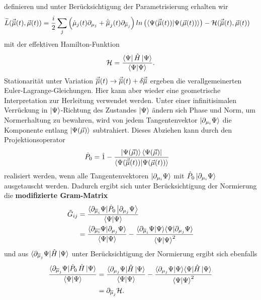 definieren und unter Berücksichtigung der Parametrisierung erhalten wir
\begin{align}
        \widetilde{L}(\vec{\overline{\mu}}(t),\vec{\mu}(t)) &= \frac{i}{2}\sum_j\left(\dot{\mu}_j(t)\partial_{\mu_j} + \dot{\overline{\mu}}_j(t)\partial_{\overline{\mu}_j}\right)
        ln\left(\langle\Psi(\vec{\overline{\mu}}(t))|\Psi(\vec{\mu}(t))\rangle\right) - \mathcal{H}(\vec{\overline{\mu}}(t),\vec{\mu}(t))
\end{align}
mit der effektiven Hamilton-Funktion
\begin{align}
    \mathcal{H} = \frac{\bra{\Psi}\hat{H}\ket{\Psi}}{\bra{\Psi}\ket{\Psi}}.
\end{align}
Stationarität unter Variation $\vec{\overline{\mu}}(t)\rightarrow \vec{\overline{\mu}}(t) + \delta\vec{\overline{\mu}}$ ergeben die 
verallgemeinerten Euler-Lagrange-Gleichungen. Hier kann aber wieder eine geometrische Interpretation zur Herleitung verwendet werden. Unter einer 
infinitisimalen Verrückung in $\ket{\Psi}$-Richtung des Zustandes $\ket{\Psi}$ ändern sich Phase und Norm, um Normerhaltung zu bewahren, wird von jedem 
Tangentenvektor $\ket{\partial_{\mu_i}\Psi}$ die Komponente entlang $\ket{\Psi(\vec{\mu})}$ subtrahiert. Dieses Abziehen kann durch den 
Projektionsoperator 
\begin{align}
    \hat{P}_0 &= \hat{1} - \frac{\ket{\Psi(\vec{\mu})}\bra{\Psi(\vec{\mu})}}{\langle\Psi(\vec{\overline{\mu}}(t))|\Psi(\vec{\mu}(t))\rangle}
\end{align}
realisiert werden, wenn alle Tangentenvektoren $\ket{\partial_{\mu_i}\Psi}$ mit $\hat{P}_0\ket{\partial_{\mu_i}\Psi}$ ausgetauscht werden.
Dadurch ergibt sich unter Berücksichtigung der Normierung die \textbf{modifizierte Gram-Matrix}
\begin{align}
    \tilde{G}_{ij} &= \frac{\langle\partial_{\overline{\mu}_i}\Psi|\hat{P}_0\ket{\partial_{\mu_j}\Psi}}{\bra{\Psi}\ket{\Psi}}  \nonumber \\
    &= \frac{\langle\partial_{\overline{\mu_i}}\Psi|\partial_{\mu_j}\Psi\rangle}{\bra{\Psi}\ket{\Psi}}
    - \frac{\langle\partial_{\overline{\mu}_i}\Psi|\Psi\rangle\langle\Psi|\partial_{\mu_j}\Psi\rangle}{\bra{\Psi}\ket{\Psi}^2}
\end{align}
und aus $ \langle\partial_{\overline{\mu}_j}\Psi|\hat{H}\ket{\Psi}$ unter Berücksichtigung der Normierung ergibt sich ebenfalls
\begin{align}
    \frac{\langle\partial_{\overline{\mu}_j}\Psi|\hat{P}_0\thinspace\hat{H}\ket{\Psi}}{\langle\Psi|\Psi\rangle}    
                &= \frac{\langle\partial_{\mu_j}\Psi|\hat{H}\ket{\Psi}}{\bra{\Psi}\ket{\Psi}} 
                - \frac{\langle\partial_{\mu_j}\Psi|\Psi\rangle\langle\Psi|\hat{H}\ket{\Psi}}{\bra{\Psi}\ket{\Psi}^2} \nonumber \\
                &= \partial_{\overline{\mu}_j}\mathcal{H} .               
\end{align}


